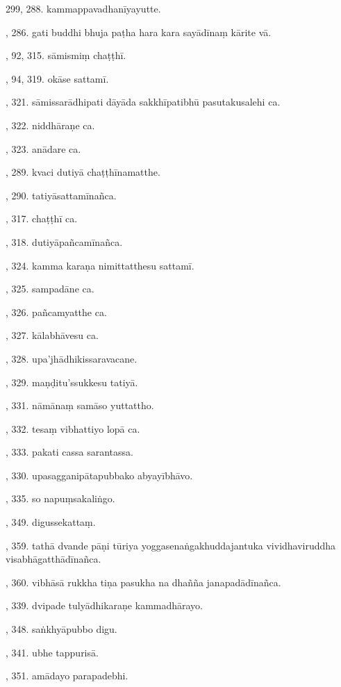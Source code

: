 299, 288. kammappavadhanīyayutte.\par {}, 286. gati buddhi bhuja paṭha hara kara sayādīnaṃ kārite vā.\par {}, 92, 315. sāmismiṃ chaṭṭhī.\par {}, 94, 319. okāse sattamī.\par {}, 321. sāmissarādhipati dāyāda sakkhīpatibhū pasutakusalehi ca.\par {}, 322. niddhāraṇe ca.\par {}, 323. anādare ca.\par {}, 289. kvaci dutiyā chaṭṭhīnamatthe.\par {}, 290. tatiyāsattamīnañca.\par {}, 317. chaṭṭhī ca.\par {}, 318. dutiyāpañcamīnañca.\par {}, 324. kamma karaṇa nimittatthesu sattamī.\par {}, 325. sampadāne ca.\par {}, 326. pañcamyatthe ca.\par {}, 327. kālabhāvesu ca.\par {}, 328. upa’jhādhikissaravacane.\par {}, 329. maṇḍitu’ssukkesu tatiyā.\par {}, 331. nāmānaṃ samāso yuttattho.\par {}, 332. tesaṃ vibhattiyo lopā ca.\par {}, 333. pakati cassa sarantassa.\par {}, 330. upasagganipātapubbako abyayībhāvo.\par {}, 335. so napuṃsakaliṅgo.\par {}, 349. digussekattaṃ.\par {}, 359. tathā dvande pāṇi tūriya yoggasenaṅgakhuddajantuka vividhaviruddha visabhāgatthādīnañca.\par {}, 360. vibhāsā rukkha tiṇa pasukha na dhañña janapadādīnañca.\par {}, 339. dvipade tulyādhikaraṇe kammadhārayo.\par {}, 348. saṅkhyāpubbo digu.\par {}, 341. ubhe tappurisā.\par {}, 351. amādayo parapadebhi.\par \noindent
